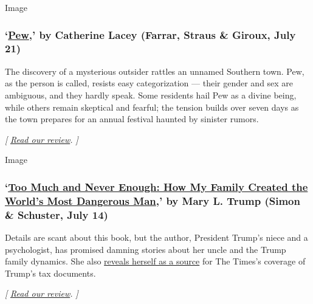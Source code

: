 Image

\hypertarget{pew-by-catherine-lacey-farrar-straus--giroux-july-21}{%
\subsubsection{\texorpdfstring{`\href{https://us.macmillan.com/books/9780374230920}{Pew},'
by Catherine Lacey (Farrar, Straus \& Giroux, July
21)}{`Pew,' by Catherine Lacey (Farrar, Straus \& Giroux, July 21)}}\label{pew-by-catherine-lacey-farrar-straus--giroux-july-21}}

The discovery of a mysterious outsider rattles an unnamed Southern town.
Pew, as the person is called, resists easy categorization --- their
gender and sex are ambiguous, and they hardly speak. Some residents hail
Pew as a divine being, while others remain skeptical and fearful; the
tension builds over seven days as the town prepares for an annual
festival haunted by sinister rumors.

\emph{{[}}
\href{https://www.nytimes3xbfgragh.onion/2020/07/13/books/review-pew-catherine-lacey.html}{\emph{Read
our review}}\emph{. {]}}

Image

\hypertarget{too-much-and-never-enough-how-my-family-created-the-worlds-most-dangerous-man-by-mary-l-trump-simon--schuster-july-14}{%
\subsubsection{\texorpdfstring{`\href{https://www.simonandschuster.com/books/Too-Much-and-Never-Enough/Mary-L-Trump/9781982141462}{Too
Much and Never Enough: How My Family Created the World's Most Dangerous
Man},' by Mary L. Trump (Simon \& Schuster, July
14)}{`Too Much and Never Enough: How My Family Created the World's Most Dangerous Man,' by Mary L. Trump (Simon \& Schuster, July 14)}}\label{too-much-and-never-enough-how-my-family-created-the-worlds-most-dangerous-man-by-mary-l-trump-simon--schuster-july-14}}

Details are scant about this book, but the author, President Trump's
niece and a psychologist, has promised damning stories about her uncle
and the Trump family dynamics. She also
\href{https://www.nytimes3xbfgragh.onion/2020/06/15/books/mary-trump-book.html}{reveals
herself as a source} for The Times's coverage of Trump's tax documents.

\emph{{[}}
\href{https://www.nytimes3xbfgragh.onion/2020/07/08/books/review-too-much-never-enough-mary-trump.html}{\emph{Read
our review}}\emph{. {]}}

